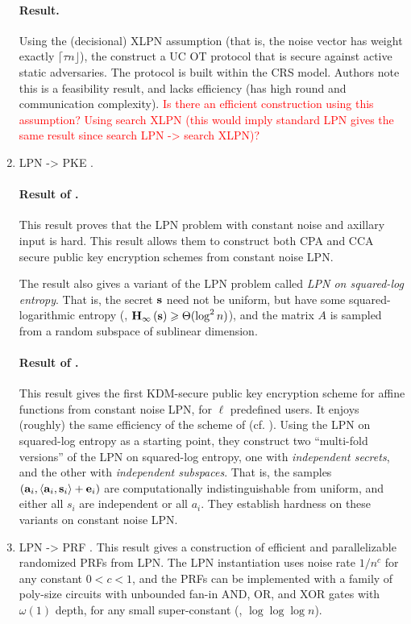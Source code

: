 \begin{enumerate}
	\paragraph{Result.} 
	Using the (decisional) XLPN assumption (that is, the noise vector has weight exactly $\lceil \tau n\rfloor$), the construct a UC OT protocol that is secure against active static adversaries.
	The protocol is built within the CRS model.
	Authors note this is a feasibility result, and lacks efficiency (has high round and communication complexity).
	\textcolor{red}{Is there an efficient construction using this assumption?
	Using search XLPN (this would imply standard LPN gives the same result since search LPN -> search XLPN)?}
	
	\item LPN -> PKE \cite{C:YuZha16,HanLiu17}.
	\paragraph{Result of \cite{C:YuZha16}.}
	This result proves that the LPN problem with constant noise and axillary input is hard.
	This result allows them to construct both CPA and CCA secure public key encryption schemes from constant noise LPN.
	
	The result also gives a variant of the LPN problem called \textit{LPN on squared-log entropy}.
	That is, the secret ${\mathbf s}$ need not be uniform, but have some squared-logarithmic entropy (\ie, $\minentropy[\bs] \geq \Theta(\log^2 n)$), and the matrix $A$ is sampled from a random subspace of sublinear dimension.
	
	\paragraph{Result of \cite{HanLiu17}.}
	This result gives the first KDM-secure public key encryption scheme for affine functions from constant noise LPN, for $\ell$ predefined users.
	It enjoys (roughly) the same efficiency of the scheme of \cite{C:YuZha16} (cf. \cite[Table 1]{HanLiu17}).
	Using the LPN on squared-log entropy as a starting point, they construct two ``multi-fold versions'' of the LPN on squared-log entropy, one with \textit{independent secrets}, and the other with \textit{independent subspaces}.
	That is, the samples $(\ba_i, \ip{\ba_i}{\bs_i}+\be_i)$ are computationally indistinguishable from uniform, and either all $s_i$ are independent or all $a_i$.
	They establish hardness on these variants on constant noise LPN.
	
	\item LPN -> PRF \cite{EC:YuSte16}.
	This result gives a construction of efficient and parallelizable randomized PRFs from LPN.
	The LPN instantiation uses noise rate $1/n^c$ for any constant $0 < c < 1$,
	and the PRFs can be implemented with a family of poly-size circuits with unbounded fan-in AND, OR, and XOR gates with $\omega(1)$ depth, for any small super-constant (\eg, $\log\log\log n$).
	

\end{enumerate}
